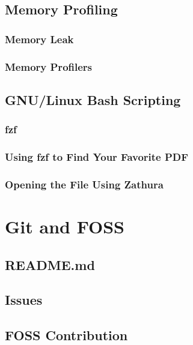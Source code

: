 \documentclass{article}
\begin{document}
\subsection{Memory Profiling}

\subsubsection{Memory Leak}

\subsubsection{Memory Profilers}

\subsection{GNU/Linux Bash Scripting}

\subsubsection{fzf}

\subsubsection{Using fzf to Find Your Favorite PDF}

\subsubsection{Opening the File Using Zathura}

\section{Git and FOSS}
\subsection{README.md}

\subsection{Issues}

\subsection{FOSS Contribution}
\end{document}
